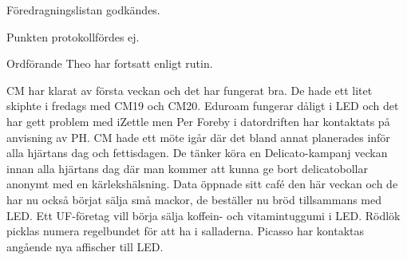 \documentclass[10pt]{article}
\begin{document}
\begin{paragrafer}

Föredragningslistan godkändes.


\begin{fyllnadsval} %


\end{fyllnadsval}

\begin{paragrafer}

Punkten protokollfördes ej.


Ordförande Theo har fortsatt enligt rutin.

CM har klarat av första veckan och det har fungerat bra. De hade ett litet skiphte i fredags med CM19 och CM20. Eduroam fungerar dåligt i LED och det har gett problem med iZettle men Per Foreby i datordriften har kontaktats på anvisning av PH. CM hade ett möte igår där det bland annat planerades inför alla hjärtans dag och fettisdagen. De tänker köra en Delicato-kampanj veckan innan alla hjärtans dag där man kommer att kunna ge bort delicatobollar anonymt med en kärlekshälsning. Data öppnade sitt café den här veckan och de har nu också börjat sälja små mackor, de beställer nu bröd tillsammans med LED. Ett UF-företag vill börja sälja koffein- och vitamintuggumi i LED. Rödlök picklas numera regelbundet för att ha i salladerna. Picasso har kontaktas angående nya affischer till LED. 


\end{paragrafer}
\end{paragrafer}
\end{document}
